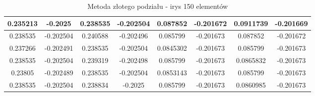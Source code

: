 \begin{table}[H]
{\begin{tabular}{|c|c|c|c|c|c|c|c|}
0.235213   & -0.2025       & 0.238535   & -0.202504     & 0.087852   & -0.201672     & 0.0911739  & -0.201669     \\ \hline
0.238535   & -0.202504     & 0.240588   & -0.202496     & 0.085799   & -0.201673     & 0.087852   & -0.201672     \\ \hline
0.237266   & -0.202491     & 0.238535   & -0.202504     & 0.0845302  & -0.201673     & 0.085799   & -0.201673     \\ \hline
0.238535   & -0.202504     & 0.239319   & -0.202498     & 0.085799   & -0.201673     & 0.0865832  & -0.201673     \\ \hline
0.23805    & -0.202489     & 0.238535   & -0.202504     & 0.0853143  & -0.201673     & 0.085799   & -0.201673     \\ \hline
0.238535   & -0.202504     & 0.238834   & -0.2025       & 0.085799   & -0.201673     & 0.0860985  & -0.201673     \\ \hline
\end{tabular}%
}
\caption{Metoda złotego podziału - irys 150 elementów}
\end{table}

